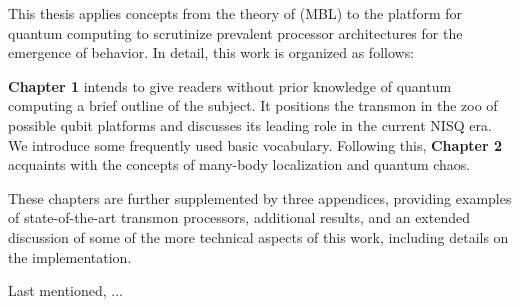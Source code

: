 
This thesis applies concepts from the theory of  (MBL) to the  platform for quantum computing to scrutinize prevalent processor architectures for the emergence of  behavior. In detail, this work is organized as follows: 

\textbf{Chapter 1} intends to give readers without prior knowledge of quantum computing a brief outline of the subject. It positions the transmon in the zoo of possible qubit platforms and discusses its leading role in the current NISQ era. We introduce some frequently used basic vocabulary. Following this, \textbf{Chapter 2} acquaints with the concepts of many-body localization and quantum chaos. 
\blindtext

These chapters are further supplemented by three appendices, providing examples of state-of-the-art transmon processors, additional results, and an extended discussion of some of the more technical aspects of this work, including details on the implementation.

Last mentioned, ...
